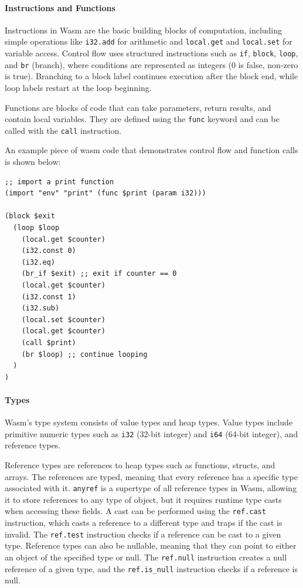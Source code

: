 \paragraph{Instructions and Functions}
Instructions in Wasm are the basic building blocks of computation, including simple operations like \texttt{i32.add} for arithmetic and \texttt{local.get} and \texttt{local.set} for variable access. Control flow uses structured instructions such as \texttt{if}, \texttt{block}, \texttt{loop}, and \texttt{br} (branch), where conditions are represented as integers (0 is false, non-zero is true). Branching to a block label continues execution after the block end, while loop labels restart at the loop beginning.

Functions are blocks of code that can take parameters, return results, and contain local variables. They are defined using the \texttt{func} keyword and can be called with the \texttt{call} instruction.

An example piece of wasm code that demonstrates control flow and function calls is shown below:
\begin{verbatim}
;; import a print function
(import "env" "print" (func $print (param i32)))

(block $exit
  (loop $loop
    (local.get $counter)
    (i32.const 0)
    (i32.eq)
    (br_if $exit) ;; exit if counter == 0
    (local.get $counter)
    (i32.const 1)
    (i32.sub)
    (local.set $counter)
    (local.get $counter)
    (call $print)
    (br $loop) ;; continue looping
  )
)
\end{verbatim}

\paragraph{Types}
Wasm's type system consists of value types and heap types. Value types include primitive numeric types such as \texttt{i32} (32-bit integer) and \texttt{i64} (64-bit integer), and reference types. 

Reference types are references to heap types such as functions, structs, and arrays. The references are typed, meaning that every reference has a specific type associated with it. \texttt{anyref} is a supertype of all reference types in Wasm, allowing it to store references to any type of object, but it requires runtime type casts when accessing these fields. A cast can be performed using the \texttt{ref.cast} instruction, which casts a reference to a different type and traps if the cast is invalid. The \texttt{ref.test} instruction checks if a reference can be cast to a given type. Reference types can also be nullable, meaning that they can point to either an object of the specified type or null. The \texttt{ref.null} instruction creates a null reference of a given type, and the \texttt{ref.is\_null} instruction checks if a reference is null.

